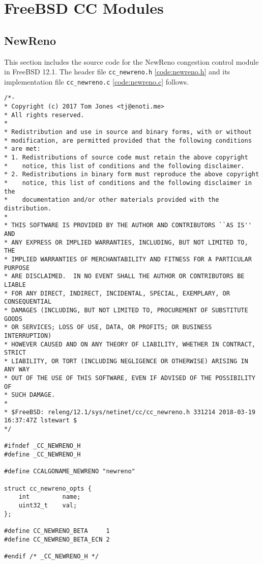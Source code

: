 \chapter{FreeBSD CC Modules} \label{app:freebsd_cc_modules}

\section{NewReno} \label{cc_newreno}

This section includes the source code for the NewReno congestion control module in FreeBSD 12.1. The header file \lstinline{cc_newreno.h} \ref{code:newreno.h} and its implementation file \lstinline{cc_newreno.c} \ref{code:newreno.c} follows.

\begin{code}
\begin{verbatim}
/*-
* Copyright (c) 2017 Tom Jones <tj@enoti.me>
* All rights reserved.
*
* Redistribution and use in source and binary forms, with or without
* modification, are permitted provided that the following conditions
* are met:
* 1. Redistributions of source code must retain the above copyright
*    notice, this list of conditions and the following disclaimer.
* 2. Redistributions in binary form must reproduce the above copyright
*    notice, this list of conditions and the following disclaimer in the
*    documentation and/or other materials provided with the distribution.
*
* THIS SOFTWARE IS PROVIDED BY THE AUTHOR AND CONTRIBUTORS ``AS IS'' AND
* ANY EXPRESS OR IMPLIED WARRANTIES, INCLUDING, BUT NOT LIMITED TO, THE
* IMPLIED WARRANTIES OF MERCHANTABILITY AND FITNESS FOR A PARTICULAR PURPOSE
* ARE DISCLAIMED.  IN NO EVENT SHALL THE AUTHOR OR CONTRIBUTORS BE LIABLE
* FOR ANY DIRECT, INDIRECT, INCIDENTAL, SPECIAL, EXEMPLARY, OR CONSEQUENTIAL
* DAMAGES (INCLUDING, BUT NOT LIMITED TO, PROCUREMENT OF SUBSTITUTE GOODS
* OR SERVICES; LOSS OF USE, DATA, OR PROFITS; OR BUSINESS INTERRUPTION)
* HOWEVER CAUSED AND ON ANY THEORY OF LIABILITY, WHETHER IN CONTRACT, STRICT
* LIABILITY, OR TORT (INCLUDING NEGLIGENCE OR OTHERWISE) ARISING IN ANY WAY
* OUT OF THE USE OF THIS SOFTWARE, EVEN IF ADVISED OF THE POSSIBILITY OF
* SUCH DAMAGE.
*
* $FreeBSD: releng/12.1/sys/netinet/cc/cc_newreno.h 331214 2018-03-19 16:37:47Z lstewart $
*/

#ifndef _CC_NEWRENO_H
#define _CC_NEWRENO_H

#define CCALGONAME_NEWRENO "newreno"

struct cc_newreno_opts {
    int			name;
    uint32_t	val;
};

#define CC_NEWRENO_BETA		1
#define CC_NEWRENO_BETA_ECN	2

#endif /* _CC_NEWRENO_H */
\end{verbatim}
\label{code:newreno.h}
\end{code}

